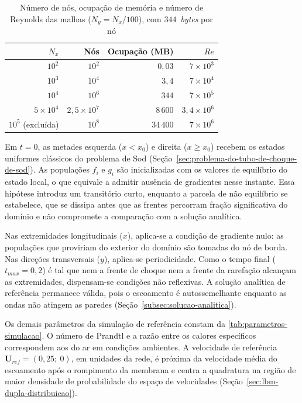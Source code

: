 \begin{table}[H]
    \centering
    \caption{Número de nós, ocupação de memória e número de Reynolds das malhas ($N_y = N_x/100$), com $344$~\textit{bytes} por nó}
    \label{tab:memoria-malhas}
    \begin{tabular}{rrrr}
        \toprule
        $N_x$ & Nós & Ocupação (MB) & $Re$ \\
        \midrule
        $10^{2}$ & $10^{2}$ & $0{,}03$ & $7 \times 10^{3}$ \\
        $10^{3}$ & $10^{4}$ & $3{,}4$ & $7 \times 10^{4}$ \\
        $10^{4}$ & $10^{6}$ & $344$ & $7 \times 10^{5}$ \\
        $5 \times 10^{4}$ & $2{,}5 \times 10^{7}$ & $8\,600$ & $3{,}4 \times 10^{6}$ \\
        \midrule
        $10^{5}$ (excluída) & $10^{8}$ & $34\,400$ & $7 \times 10^{6}$ \\
        \bottomrule
    \end{tabular}
\end{table}

Em $t = 0$, as metades esquerda ($x < x_0$) e direita ($x \ge x_0$) recebem os estados uniformes clássicos do problema de Sod (Seção~\ref{sec:problema-do-tubo-de-choque-de-sod}).
As populações $f_i$ e $g_i$ são inicializadas com os valores de equilíbrio do estado local, o que equivale a admitir ausência de gradientes nesse instante.
Essa hipótese introduz um transitório curto, enquanto a parcela de não equilíbrio se estabelece, que se dissipa antes que as frentes percorram fração significativa do domínio e não compromete a comparação com a solução analítica.

Nas extremidades longitudinais ($x$), aplica-se a condição de gradiente nulo: as populações que proviriam do exterior do domínio são tomadas do nó de borda.
Nas direções transversais ($y$), aplica-se periodicidade.
Como o tempo final ($t_{max} = 0{,}2$) é tal que nem a frente de choque nem a frente da rarefação alcançam as extremidades, dispensam-se condições não reflexivas.
A solução analítica de referência permanece válida, pois o escoamento é autossemelhante enquanto as ondas não atingem as paredes (Seção~\ref{subsec:solucao-analitica}).

Os demais parâmetros da simulação de referência constam da \autoref{tab:parametros-simulacao}.
O número de Prandtl e a razão entre os calores específicos correspondem aos do ar em condições ambientes.
A velocidade de referência $\mathbf{U}_{ref} = (0{,}25;\ 0)$, em unidades da rede, é próxima da velocidade média do escoamento após o rompimento da membrana e centra a quadratura na região de maior densidade de probabilidade do espaço de velocidades (Seção~\ref{sec:lbm-dupla-distribuicao}).

